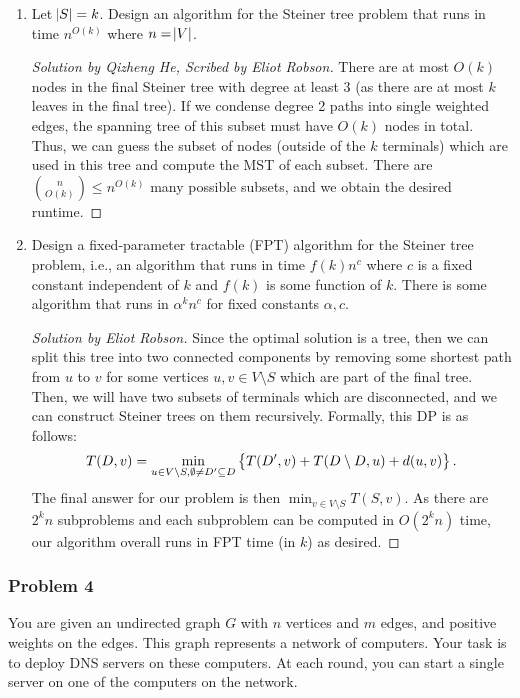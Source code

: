 \documentclass{article}
\newenvironment{solution}[1]{\begin{proof}[Solution by #1]}{\end{proof}}
\newenvironment{scribed}[2]{\begin{proof}[Solution by #1, Scribed by #2]}{\end{proof}}
\begin{document}
\begin{enumerate}
    \item Let \(\abs{S} = k\). Design an algorithm for the Steiner tree problem that runs in time \(n^{O(k)}\) where \(n = \abs{V}\). %
    
    \begin{scribed}{Qizheng He}{Eliot Robson}
        There are at most \(O(k)\) nodes in the final Steiner tree with degree at least 3 (as there are at most \(k\) leaves in the final tree). If we condense degree 2 paths into single weighted edges, the spanning tree of this subset must have \(O(k)\) nodes in total. Thus, we can guess the subset of nodes (outside of the \(k\) terminals) which are used in this tree and compute the MST of each subset. There are \(\binom{n}{O(k)} \leq n^{O(k)}\) many possible subsets, and we obtain the desired runtime.
    \end{scribed}

    \item Design a fixed-parameter tractable (FPT) algorithm for the Steiner tree problem, i.e., an algorithm that runs in time \(f(k) n^c\) where \(c\) is a fixed constant independent of \(k\) and \(f(k)\) is some function of \(k\). There is some algorithm that runs in \(\alpha^{k} n^{c}\) for fixed constants \(\alpha, c\). %
    
    \begin{solution}{Eliot Robson}
        Since the optimal solution is a tree, then we can split this tree into two connected components by removing some shortest path from \(u\) to \(v\) for some vertices \(u,v \in V \setminus S\) which are part of the final tree. Then, we will have two subsets of terminals which are disconnected, and we can construct Steiner trees on them recursively. Formally, this DP is as follows:
        \[
            T(D, v)
            =%
            \min_{u \in V \setminus S, \emptyset \neq D' \subseteq D}
            \set{T(D', v) + T(D \setminus D, u) + d(u,v)}.
        \]
        The final answer for our problem is then \(\min_{v \in V \setminus S} T(S, v)\). As there are \(2^{k} n\) subproblems and each subproblem can be computed in \(O(2^{k} n)\) time, our algorithm overall runs in FPT time (in \(k\)) as desired.
    \end{solution}
\end{enumerate}

\subsubsection{Problem 4}
You are given an undirected graph \(G\) with \(n\) vertices and \(m\) edges, and positive weights on the edges. This graph represents a network of computers. Your task is to deploy DNS servers on these computers. At each round, you can start a single server on one of the computers on the network.
\end{document}
